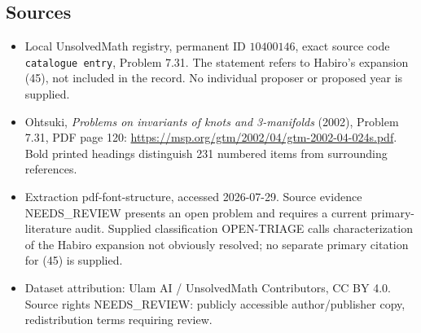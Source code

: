 \documentclass[11pt]{article}
\begin{document}
\subsection{Sources}
\begin{itemize}
\item Local UnsolvedMath registry, permanent ID \(10400146\), exact source code \texttt{catalogue entry}, Problem 7.31. The statement refers to Habiro's expansion (45), not included in the record. No individual proposer or proposed year is supplied.
\item Ohtsuki, \emph{Problems on invariants of knots and 3-manifolds} (2002), Problem 7.31, PDF page 120: \url{https://msp.org/gtm/2002/04/gtm-2002-04-024s.pdf}. Bold printed headings distinguish 231 numbered items from surrounding references.
\item Extraction pdf-font-structure, accessed 2026-07-29. Source evidence NEEDS\_REVIEW presents an open problem and requires a current primary-literature audit. Supplied classification OPEN-TRIAGE calls characterization of the Habiro expansion not obviously resolved; no separate primary citation for (45) is supplied.
\item Dataset attribution: Ulam AI / UnsolvedMath Contributors, CC BY 4.0. Source rights NEEDS\_REVIEW: publicly accessible author/publisher copy, redistribution terms requiring review.
\end{itemize}
\end{document}
